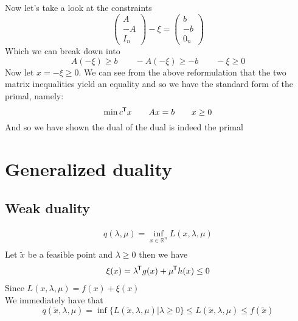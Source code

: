 \documentclass{article}
\newcommand*{\tran}{^{\mkern-1.5mu\mathsf{T}}}%
\begin{document}
	Now let's take a look at  the constraints
	\begin{equation}
		\begin{pmatrix}
		A\\
		-A\\
		I_n
		\end{pmatrix}
		-\xi =  \begin{pmatrix}
		b\\
		-b\\
		0_n 
		\end{pmatrix}
	\end{equation}
	Which we can break down into 
	\begin{equation}
		A(-\xi) \geq  b \qquad -A(-\xi) \geq -b \qquad -\xi \geq 0
	\end{equation}
	Now let $x = -\xi \geq 0$. We can see from the above reformulation that the two matrix inequalities yield an equality and so we have the standard form of the primal, namely:
	\begin{equation}
		\min c\tran x \qquad Ax = b \qquad x \geq 0 
	\end{equation}
	And so we have shown the dual of the dual is indeed the primal
	
	\clearpage
	
	\section{Generalized duality}
	\subsection{Weak duality}
	
	\begin{align*}
		q(\lambda , \mu ) = \inf_{x \in \mathbb{R}^n} L(x, \lambda, \mu)\\[2ex]
	\end{align*}
	Let $\tilde{x}$ be a feasible point and $\lambda \geq 0 $ then we have
	\begin{align}
		\xi(x) = \lambda \tran g(x) + \mu\tran h(x) \leq 0 
	\end{align}
	Since $L(x,\lambda,\mu) = f(x) + \xi(x)$\\[2ex]
	We immediately have that 
	\begin{equation*}
		q(\tilde x , \lambda, \mu) = \inf \{L(\tilde x,\lambda,\mu) \vert \lambda \geq 0 \} \leq L(\tilde x,\lambda ,\mu) \leq f(\tilde x)
	\end{equation*}
	
\end{document}
